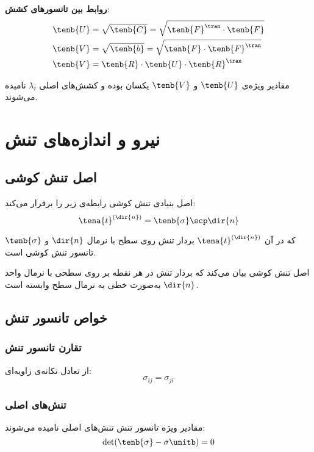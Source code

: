 \textbf{روابط بین تانسورهای کشش}:
\begin{align}
	\tenb{U} & = \sqrt{\tenb{C}} = \sqrt{\tenb{F}^\tran \cdot \tenb{F}} \\
	\tenb{V} & = \sqrt{\tenb{b}} = \sqrt{\tenb{F} \cdot \tenb{F}^\tran} \\
	\tenb{V} & = \tenb{R} \cdot \tenb{U} \cdot \tenb{R}^\tran
\end{align}

مقادیر ویژه‌ی $\tenb{U}$ و $\tenb{V}$ یکسان بوده و کشش‌های اصلی $\lambda_i$ نامیده می‌شوند.

\section{نیرو و اندازه‌های تنش}

\subsection{اصل تنش کوشی}

اصل بنیادی تنش کوشی رابطه‌ی زیر را برقرار می‌کند:
\begin{equation}
	\tena{t}^{(\dir{n})} = \tenb{\sigma} \scp \dir{n}
\end{equation}

که در آن $\tena{t}^{(\dir{n})}$ بردار تنش روی سطح با نرمال $\dir{n}$ و $\tenb{\sigma}$ تانسور تنش کوشی است.

\begin{keypoint}
	اصل تنش کوشی بیان می‌کند که بردار تنش در هر نقطه بر روی سطحی با نرمال واحد $\dir{n}$ به‌صورت خطی به نرمال سطح وابسته است.
\end{keypoint}

\subsection{خواص تانسور تنش}

\subsubsection{تقارن تانسور تنش}
از تعادل تکانه‌ی زاویه‌ای:
\begin{equation}
	\sigma_{ij} = \sigma_{ji}
\end{equation}

\subsubsection{تنش‌های اصلی}
مقادیر ویژه تانسور تنش تنش‌های اصلی نامیده می‌شوند:
\begin{equation}
	\det(\tenb{\sigma} - \sigma \unitb) = 0
\end{equation}

